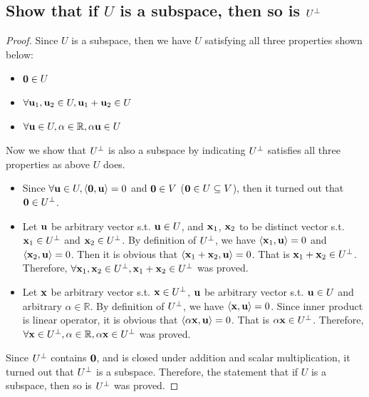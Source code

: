 \documentclass[11pt,a4paper]{article}
\begin{document}
\subsection{Show that if $U$ is a subspace, then so is $U^{\perp}$}
\begin{proof}
    Since $U$ is a subspace, then we have $U$ satisfying all three properties
    shown below:
    \begin{itemize}
       \item $\mathbf{0} \in U$ 
       \item $\forall \mathbf{u}_1, \mathbf{u}_2 \in U, \mathbf{u}_1 + \mathbf{u}_2 \in U$
       \item $\forall \mathbf{u} \in U, \alpha \in \mathbb{R}, \alpha \mathbf{u} \in U$
    \end{itemize}
    Now we show that $U^{\perp}$ is also a subspace by indicating $U^{\perp}$
    satisfies all three properties as above $U$ does.
    \begin{itemize}
        \item Since $\forall \mathbf{u} \in U, \langle \mathbf{0}, \mathbf{u} \rangle = 0$
            and $\mathbf{0} \in V$ ($\mathbf{0} \in U \subseteq V$), then it
            turned out that $\mathbf{0} \in U^{\perp}$.
        \item Let $\mathbf{u}$ be arbitrary vector s.t. $\mathbf{u} \in U$, and
            $\mathbf{x}_1$, $\mathbf{x}_2$ to be distinct vector s.t. $\mathbf{x}_1 \in U^{\perp}$
            and $\mathbf{x}_2 \in U^{\perp}$. By definition of $U^{\perp}$, we have 
            $\langle \mathbf{x}_1, \mathbf{u} \rangle = 0$ and 
            $\langle \mathbf{x}_2, \mathbf{u} \rangle = 0$. 
            Then it is obvious that 
            $\langle \mathbf{x}_1 + \mathbf{x}_2, \mathbf{u} \rangle = 0$. 
            That is $\mathbf{x}_1 +\mathbf{x}_2 \in U^{\perp}$.
            Therefore, $\forall \mathbf{x}_1, \mathbf{x}_2 \in U^{\perp}, \mathbf{x}_1+\mathbf{x}_2 \in U^{\perp}$ was proved.
        \item Let $\mathbf{x}$ be arbitrary vector s.t. $\mathbf{x} \in U^{\perp}$, 
            $\mathbf{u}$ be arbitrary vector s.t. $\mathbf{u} \in U$ and
            arbitrary $\alpha \in \mathbb{R}$. By definition of $U^{\perp}$, we have 
            $\langle \mathbf{x}, \mathbf{u} \rangle = 0$. 
            Since inner product is linear operator, it is obvious that
            $\langle \alpha \mathbf{x}, \mathbf{u} \rangle = 0$. 
            That is $\alpha \mathbf{x} \in U^{\perp}$.
            Therefore, $\forall \mathbf{x} \in U^{\perp}, \alpha \in \mathbb{R}, \alpha
            \mathbf{x} \in U^{\perp}$ was proved.
    \end{itemize}
    Since $U^{\perp}$ contains $\mathbf{0}$, and is closed under addition and scalar
    multiplication, it turned out that $U^{\perp}$ is a subspace. 
    Therefore, the statement that if $U$ is a subspace, then so is $U^{\perp}$ was
    proved.
\end{proof}
\end{document}
